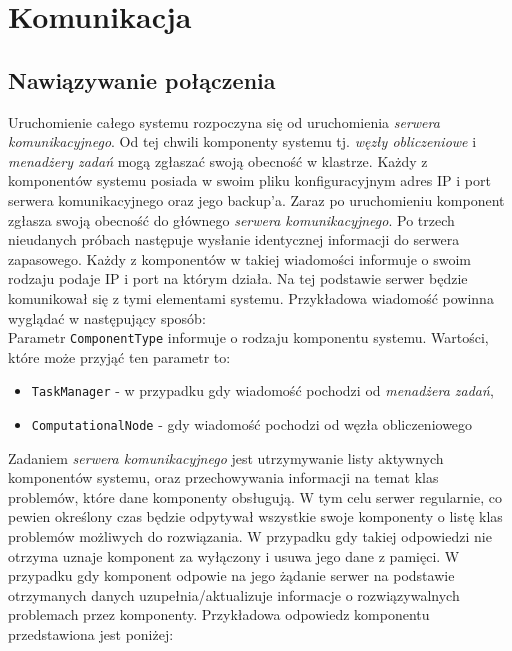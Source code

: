 \documentclass[12pt,a4paper,titlepage]{report}
\begin{document}
	\chapter{Komunikacja}
	\section{Nawiązywanie połączenia}
	Uruchomienie całego systemu rozpoczyna się od uruchomienia \textit{serwera komunikacyjnego}. Od tej chwili komponenty systemu 
	tj. \textit{węzły obliczeniowe}
	i \textit{menadżery zadań} mogą zgłaszać swoją obecność w klastrze. Każdy z komponentów systemu posiada w swoim pliku konfiguracyjnym adres IP i port serwera komunikacyjnego oraz jego backup'a. Zaraz po uruchomieniu komponent zgłasza swoją obecność  do głównego \textit{serwera komunikacyjnego}. Po trzech nieudanych próbach następuje wysłanie identycznej informacji do serwera zapasowego. Każdy z komponentów w takiej wiadomości informuje o swoim rodzaju podaje IP i port na którym działa. 
	Na tej podstawie serwer będzie komunikował się z tymi elementami systemu. Przykładowa wiadomość powinna wyglądać w następujący sposób: \\
	  

	Parametr \verb+ComponentType+ informuje o rodzaju komponentu systemu. Wartości, które może przyjąć ten parametr to:
	\begin{itemize}
		\item \verb+TaskManager+ - w przypadku gdy wiadomość pochodzi od \textit{menadżera zadań},
		\item \verb+ComputationalNode+ - gdy wiadomość pochodzi od węzła obliczeniowego
	\end{itemize}		 

	Zadaniem \textit{serwera komunikacyjnego} jest utrzymywanie listy aktywnych komponentów systemu, oraz przechowywania informacji na temat klas problemów, które dane komponenty obsługują. W tym celu serwer regularnie, co pewien określony czas
będzie odpytywał wszystkie swoje komponenty o listę klas problemów możliwych do rozwiązania. W przypadku gdy takiej odpowiedzi nie otrzyma uznaje komponent za wyłączony i usuwa jego dane z pamięci. W przypadku gdy komponent odpowie na jego żądanie serwer 
na podstawie otrzymanych danych uzupełnia/aktualizuje informacje o rozwiązywalnych problemach przez komponenty. 
Przykładowa odpowiedz komponentu przedstawiona jest poniżej: \\
	 
\end{document}
